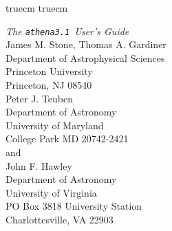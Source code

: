 \nonstopmode
{}

\setlength{\textheight}{9.0in}
\setlength{\textwidth}{6.5in}
 truecm
 truecm

\newcommand{\SEP}[1]{\setlength{\fboxsep}{#1pt}}
\newsavebox{\Qbox}
\newenvironment{Ebox}{\hspace*{.1in}%
\begin{lrbox}{\Qbox}%
\begin{minipage}[t]{4.4in}\it\sffamily}%
{\end{minipage}%
\end{lrbox}\vspace{6pt}\SEP{6}%
\fbox{\usebox{\Qbox}}\vspace{6pt}\SEP{3}}



\newcommand{\ath}{{\tt athena3.1}}
\newcommand{\Dx}[0]{\bigtriangleup x}

\makeatletter                                            %
\def\plotone#1{\centering \leavevmode                    %
\epsfxsize=\columnwidth \epsfbox{#1}}                    %
\def\plotone_reduction#1#2{\centering \leavevmode        %
\epsfxsize=#2\columnwidth \epsfbox{#1}}                  %
\def\plottwo#1#2{\centering \leavevmode                  %
\epsfxsize=.45\columnwidth \epsfbox{#1} \hfil            %
\epsfxsize=.45\columnwidth \epsfbox{#2}}                 %
\def\plotfiddle#1#2#3#4#5#6#7{\centering \leavevmode     %
\vbox to#2{\rule{0pt}{#2}}                               %
\special{psfile=#1 voffset=#7 hoffset=#6 vscale=#5 hscale=#4 angle=#3}} %
\makeatother




\begin{center}
{\huge {\it The \ath\ User's Guide }} \vspace{1in} \\
{\Large James M. Stone, Thomas A. Gardiner} \\
{\large Department of Astrophysical Sciences \\ Princeton University \\
Princeton, NJ 08540} \vspace{0.5in} \\
{\Large Peter J. Teuben} \\
{\large Department of Astronomy \\ University of
Maryland \\ College Park MD 20742-2421} \vspace{0.5in} \\
and \vspace{0.5in} \\
{\Large John F. Hawley} \\
{\large Department of Astronomy \\ University of
Virginia \\ PO Box 3818 University Station \\ Charlottesville, VA 22903} \vspace{1in} \\
\end{center}
\newpage

